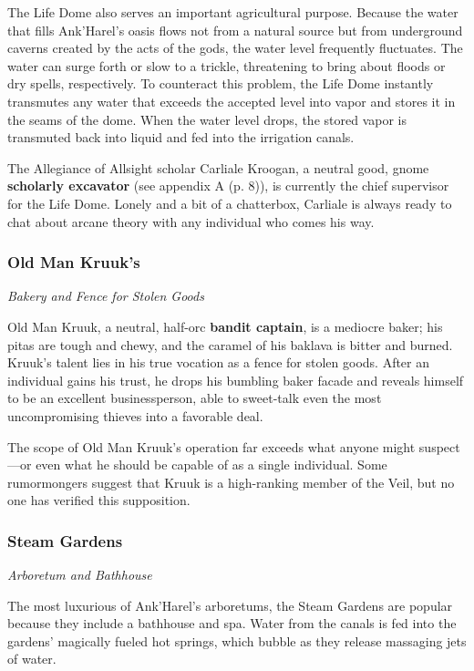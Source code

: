 \documentclass[letterpaper, 11pt, bg=full, twocolumn]{dndbook}
\begin{document}
The Life Dome also serves an important agricultural purpose. Because the water that fills Ank'Harel's oasis flows not from a natural source but from underground caverns created by the acts of the gods, the water level frequently fluctuates. The water can surge forth or slow to a trickle, threatening to bring about floods or dry spells, respectively. To counteract this problem, the Life Dome instantly transmutes any water that exceeds the accepted level into vapor and stores it in the seams of the dome. When the water level drops, the stored vapor is transmuted back into liquid and fed into the irrigation canals.

The Allegiance of Allsight scholar Carliale Kroogan, a neutral good, gnome \textbf{scholarly excavator} (see appendix A (p. 8)), is currently the chief supervisor for the Life Dome. Lonely and a bit of a chatterbox, Carliale is always ready to chat about arcane theory with any individual who comes his way.

\subsubsection{Old Man Kruuk's}

\textit{Bakery and Fence for Stolen Goods}

Old Man Kruuk, a neutral, half-orc \textbf{bandit captain}, is a mediocre baker; his pitas are tough and chewy, and the caramel of his baklava is bitter and burned. Kruuk's talent lies in his true vocation as a fence for stolen goods. After an individual gains his trust, he drops his bumbling baker facade and reveals himself to be an excellent businessperson, able to sweet-talk even the most uncompromising thieves into a favorable deal.

The scope of Old Man Kruuk's operation far exceeds what anyone might suspect---or even what he should be capable of as a single individual. Some rumormongers suggest that Kruuk is a high-ranking member of the Veil, but no one has verified this supposition.

\subsubsection{Steam Gardens}

\textit{Arboretum and Bathhouse}

The most luxurious of Ank'Harel's arboretums, the Steam Gardens are popular because they include a bathhouse and spa. Water from the canals is fed into the gardens' magically fueled hot springs, which bubble as they release massaging jets of water.
\end{document}
